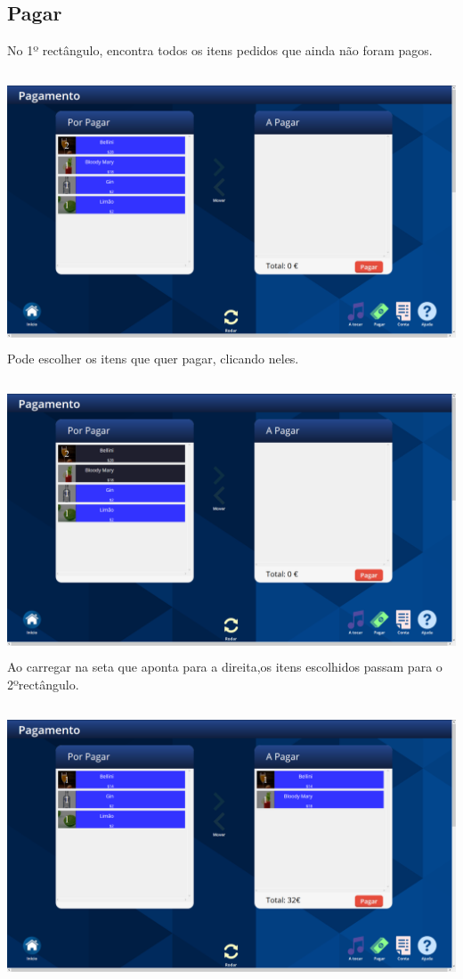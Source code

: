 \documentclass{article}
\begin{document}
\subsection{Pagar}
No 1º rectângulo, encontra todos os itens pedidos que ainda não foram pagos.\\\\
\includegraphics[width=15cm, height=8cm]{user_manual_images/pay_menu.png}
Pode escolher os itens que quer pagar, clicando neles.\\\\
\includegraphics[width=15cm, height=8cm]{user_manual_images/select_pay.png}
Ao carregar na seta que aponta para a direita,os itens escolhidos passam para o 2ºrectângulo.\\\\
\includegraphics[width=15cm, height=8cm]{user_manual_images/moved_itens.png}
\end{document}
